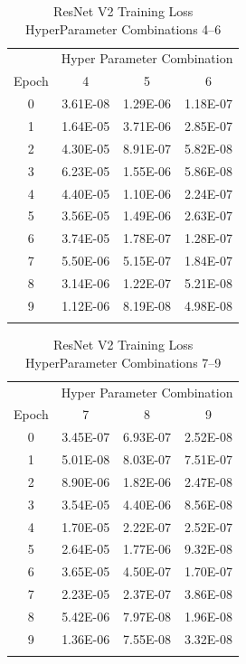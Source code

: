 \documentclass[10pt, conference]{IEEEtran}
\begin{document}
\begin{table}[H]
    \centering
    \begin{tabular}{@{}cccc@{}}
        \toprule
        & \multicolumn{3}{c}{Hyper Parameter Combination} \\
        \cmidrule{2-4}
            Epoch  & 4 & 5 & 6\\
        \midrule

        0 & 3.61E-08 & 1.29E-06 & 1.18E-07 \\
        1 & 1.64E-05 & 3.71E-06 & 2.85E-07 \\
        2 & 4.30E-05 & 8.91E-07 & 5.82E-08 \\
        3 & 6.23E-05 & 1.55E-06 & 5.86E-08 \\
        4 & 4.40E-05 & 1.10E-06 & 2.24E-07 \\
        5 & 3.56E-05 & 1.49E-06 & 2.63E-07 \\
        6 & 3.74E-05 & 1.78E-07 & 1.28E-07 \\
        7 & 5.50E-06 & 5.15E-07 & 1.84E-07 \\
        8 & 3.14E-06 & 1.22E-07 & 5.21E-08 \\
        9 & 1.12E-06 & 8.19E-08 & 4.98E-08 \\

        \bottomrule\smallskip
    \end{tabular}
    \caption{ResNet V2 Training Loss HyperParameter Combinations 4--6}%
    \label{table:ResNetTrainingLoss4-6}
\end{table}


\begin{table}[H]
    \centering
    \begin{tabular}{@{}cccc@{}}
        \toprule
        & \multicolumn{3}{c}{Hyper Parameter Combination} \\
        \cmidrule{2-4}
            Epoch  & 7 & 8 & 9\\
        \midrule

        0 & 3.45E-07 & 6.93E-07 & 2.52E-08 \\
        1 & 5.01E-08 & 8.03E-07 & 7.51E-07 \\
        2 & 8.90E-06 & 1.82E-06 & 2.47E-08 \\
        3 & 3.54E-05 & 4.40E-06 & 8.56E-08 \\
        4 & 1.70E-05 & 2.22E-07 & 2.52E-07 \\
        5 & 2.64E-05 & 1.77E-06 & 9.32E-08 \\
        6 & 3.65E-05 & 4.50E-07 & 1.70E-07 \\
        7 & 2.23E-05 & 2.37E-07 & 3.86E-08 \\
        8 & 5.42E-06 & 7.97E-08 & 1.96E-08 \\
        9 & 1.36E-06 & 7.55E-08 & 3.32E-08 \\

        \bottomrule\smallskip
    \end{tabular}
    \caption{ResNet V2 Training Loss HyperParameter Combinations 7--9}%
    \label{table:ResNetTrainingLoss7-9}
\end{table}
\end{document}
